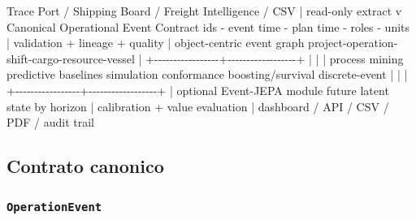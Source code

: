 \documentclass[
  spanish,
  10pt,
  a4paper,
]{article}
\newenvironment{Shaded}{}{}
\newcommand{\NormalTok}[1]{#1}
\begin{document}
\begin{Shaded}
\begin{Highlighting}[]
\NormalTok{Trace Port / Shipping Board / Freight Intelligence / CSV}
\NormalTok{                          |}
\NormalTok{                  read{-}only extract}
\NormalTok{                          v}
\NormalTok{          Canonical Operational Event Contract}
\NormalTok{         ids {-} event time {-} plan time {-} roles {-} units}
\NormalTok{                          |}
\NormalTok{              validation + lineage + quality}
\NormalTok{                          |}
\NormalTok{              object{-}centric event graph}
\NormalTok{       project{-}operation{-}shift{-}cargo{-}resource{-}vessel}
\NormalTok{                          |}
\NormalTok{        +{-}{-}{-}{-}{-}{-}{-}{-}{-}{-}{-}{-}{-}{-}{-}{-}{-}+{-}{-}{-}{-}{-}{-}{-}{-}{-}{-}{-}{-}{-}{-}{-}{-}{-}{-}+}
\NormalTok{        |                 |                  |}
\NormalTok{ process mining     predictive baselines   simulation}
\NormalTok{ conformance        boosting/survival      discrete{-}event}
\NormalTok{        |                 |                  |}
\NormalTok{        +{-}{-}{-}{-}{-}{-}{-}{-}{-}{-}{-}{-}{-}{-}{-}{-}{-}+{-}{-}{-}{-}{-}{-}{-}{-}{-}{-}{-}{-}{-}{-}{-}{-}{-}{-}+}
\NormalTok{                          |}
\NormalTok{              optional Event{-}JEPA module}
\NormalTok{              future latent state by horizon}
\NormalTok{                          |}
\NormalTok{             calibration + value evaluation}
\NormalTok{                          |}
\NormalTok{       dashboard / API / CSV / PDF / audit trail}
\end{Highlighting}
\end{Shaded}

\subsection{Contrato canonico}\label{contrato-canonico}

\subsubsection{\texorpdfstring{\texttt{OperationEvent}}{OperationEvent}}\label{operationevent}
\end{document}

